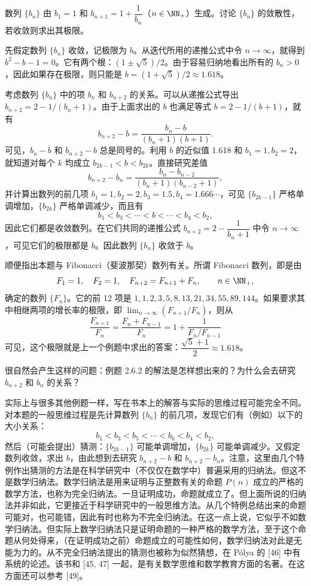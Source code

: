 \begin{xexample}[2.6.2]
数列 $\{b_n\}$ 由 $b_1=1$ 和 $b_{n+1}=1+\dfrac1{b_n}$（$n\in\NN_+$）生成。讨论 $\{b_n\}$ 的敛散性，若收敛则求出其极限。
\end{xexample}
\begin{xsolution}
先假定数列 $\{b_n\}$ 收敛，记极限为 $b$。从迭代所用的递推公式中令 $n\to\infty$，就得到 $b^2-b-1=0$。它有两个根：$(1\pm\sqrt5)/2$。由于容易归纳地看出所有的 $b_n>0$，因此如果存在极限，则只能是 $b=(1+\sqrt5)/2\approx1.618$。

考虑数列 $\{b_n\}$ 中的项 $b_n$ 和 $b_{n+2}$ 的关系。可以从递推公式导出 $b_{n+2}=2-1/(b_n+1)$。由于上面求出的 $b$ 也满足等式 $b=2-1/(b+1)$，就有
\begin{equation}
  b_{n+2}-b=\frac{b_n-b}{(b_n+1)(b+1)}.
  \tag{2.17}
  \label{eq:2.17}
\end{equation}
可见，$b_n-b$ 和 $b_{n+2}-b$ 总是同号的。利用 $b$ 的近似值 1.618 和 $b_1=1,b_2=2$，就知道对每个 $k$ 均成立 $b_{2k-1}<b<b_{2k}$。直接研究差值
\[
  b_{n+2}-b_n=\frac{b_n-b_{n-2}}{(b_n+1)(b_{n-2}+1)},
\]
并计算出数列的前几项 $b_1=1,b_2=2,b_3=1.5,b_4=1.666\cdots$，可见 $\{b_{2k-1}\}$ 严格单调增加，$\{b_{2k}\}$ 严格单调减少，而且有
\[
  b_1<b_3<\cdots<b<\cdots<b_4<b_2,
\]
因此它们都是收敛数列。在它们共同的递推公式 $b_{n+2}=2-\dfrac1{b_n+1}$ 中令 $n\to\infty$，可见它们的极限都是 $b$。因此数列 $\{b_n\}$ 收敛于 $b$。
\end{xsolution}

\begin{xremark}
顺便指出本题与 Fibonacci（斐波那契）数列有关。所谓 Fibonacci 数列，即是由
\[
  F_1=1,\quad F_2=1,\quad F_{n+2}=F_{n+1}+F_n,\qquad n\in\NN_+,
\]
确定的数列 $\{F_n\}$。它的前 12 项是 $1,1,2,3,5,8,13,21,34,55,89,144$。如果要求其中相继两项的增长率的极限，即 $\displaystyle\lim_{n\to\infty}(F_{n+1}/F_n)$，则从
\[
  \frac{F_{n+1}}{F_n}=\frac{F_n+F_{n-1}}{F_n}
  =1+\frac1{F_n/F_{n-1}}
\]
可见，这个极限就是上一个例题中求出的答案：$\dfrac{\sqrt5+1}{2}\approx1.618$。
\end{xremark}

很自然会产生这样的问题：例题 2.6.2 的解法是怎样想出来的？为什么会去研究 $b_{n+2}$ 和 $b_n$ 的关系？

实际上与很多其他例题一样，写在书本上的解答与实际的思维过程可能完全不同。对本题的一般思维过程是先计算数列 $\{b_n\}$ 的前几项，发现它们有（例如）以下的大小关系：
\[
  b_1<b_3<b_5<\cdots<b_6<b_4<b_2,
\]
然后（可能会提出）猜测：$\{b_{2k-1}\}$ 可能单调增加，$\{b_{2k}\}$ 可能单调减少。又假定数列收敛，求出 $b$，由此想到去研究 $b_{n+2}-b$ 和 $b_{n+2}-b_n$。注意，这里由几个特例作出猜测的方法是在科学研究中（不仅仅在数学中）普遍采用的归纳法。但这不是数学归纳法。数学归纳法是用来证明与正整数有关的命题 $P(n)$ 成立的严格的数学方法，也称为完全归纳法。一旦证明成功，命题就成立了。但上面所说的归纳法并非如此，它更接近于科学研究中的一般思维方法。从几个特例总结出来的命题可能对，也可能错，因此有时也称为不完全归纳法。在这一点上说，它似乎不如数学归纳法。但实际上数学归纳法只是证明命题的一种严格的数学方法，至于这个命题从何处得来，（在证明成功之前）命题成立的可能性如何，数学归纳法对此是无能为力的。从不完全归纳法提出的猜测也被称为似然猜想，在 Pólya 的 [46] 中有系统的论述。该书和 [45, 47] 一起，是有关数学思维和数学教育方面的名著。在这方面还可以参考 [49]。

